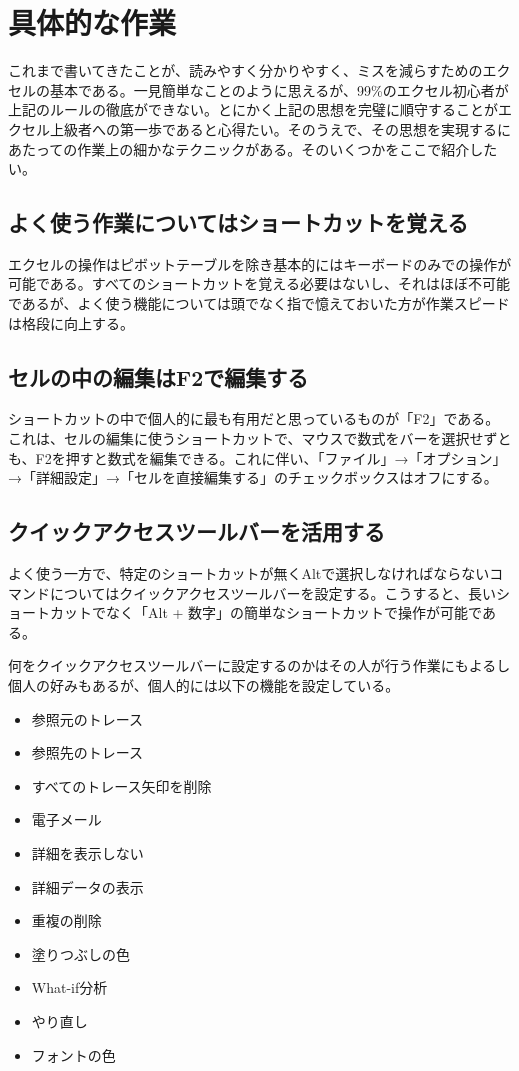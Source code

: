 \documentclass[dvipdfmx]{jsarticle}
\begin{document}
\section{具体的な作業}
これまで書いてきたことが、読みやすく分かりやすく、ミスを減らすためのエクセルの基本である。一見簡単なことのように思えるが、99\%のエクセル初心者が上記のルールの徹底ができない。とにかく上記の思想を完璧に順守することがエクセル上級者への第一歩であると心得たい。そのうえで、その思想を実現するにあたっての作業上の細かなテクニックがある。そのいくつかをここで紹介したい。
\subsection{よく使う作業についてはショートカットを覚える}
エクセルの操作はピボットテーブルを除き基本的にはキーボードのみでの操作が可能である。すべてのショートカットを覚える必要はないし、それはほぼ不可能であるが、よく使う機能については頭でなく指で憶えておいた方が作業スピードは格段に向上する。

\subsection{セルの中の編集はF2で編集する}
ショートカットの中で個人的に最も有用だと思っているものが「F2」である。これは、セルの編集に使うショートカットで、マウスで数式をバーを選択せずとも、F2を押すと数式を編集できる。これに伴い、「ファイル」→「オプション」→「詳細設定」→「セルを直接編集する」のチェックボックスはオフにする。

\subsection{クイックアクセスツールバーを活用する}
よく使う一方で、特定のショートカットが無くAltで選択しなければならないコマンドについてはクイックアクセスツールバーを設定する。こうすると、長いショートカットでなく「Alt + 数字」の簡単なショートカットで操作が可能である。

何をクイックアクセスツールバーに設定するのかはその人が行う作業にもよるし個人の好みもあるが、個人的には以下の機能を設定している。
\begin{itemize}
\item 参照元のトレース
\item 参照先のトレース
\item すべてのトレース矢印を削除
\item 電子メール
\item 詳細を表示しない
\item 詳細データの表示
\item 重複の削除
\item 塗りつぶしの色
\item What-if分析
\item やり直し
\item フォントの色
\end{itemize}
\end{document}
